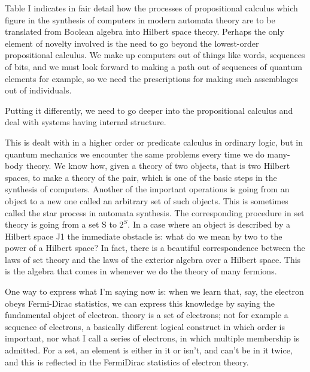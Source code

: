 Table I indicates in fair detail how the processes of propositional calculus which figure in the synthesis of computers in modern automata theory are to be translated from Boolean algebra into Hilbert space theory. Perhaps the only element of novelty involved is the need to go beyond the lowest-order propositional calculus. We make up computers out of things like words, sequences of bits, and we must look forward to making a path out of sequences of quantum elements for example, so we need the prescriptions for making such assemblages out of individuals.

Putting it differently, we need to go deeper into the propositional calculus and deal with systems having internal structure.

This is dealt with in a higher order or predicate calculus in ordinary logic, but in quantum mechanics we encounter the same problems every time we do many-body theory. We know how, given a theory of two objects, that is two Hilbert spaces, to make a theory of the pair, which is one of the basic steps in the synthesis of computers. Another of the important operations is going from an object to a new one called an arbitrary set of such objects. This is sometimes called the star process in automata synthesis.
The corresponding procedure in set theory is going from a set S to $2^S$. In a case where an object is described by a Hilbert space J1 the immediate obstacle is: what do we mean by two to the power of a Hilbert space? In fact, there is a beautiful correspondence between the laws of set theory and the laws of the exterior algebra over a Hilbert space. This is the algebra that comes in whenever we do the theory of many fermions.

One way to express what I'm saying now is: when we learn that, say, the electron obeys Fermi-Dirac statistics, we can express this knowledge by saying the fundamental object of electron. theory is a set of electrons; not for example a sequence of electrons, a basically different logical construct in which order is important, nor what I call a series of electrons, in which multiple membership is admitted. For a set, an element is either in it or isn't, and can't be in it twice, and this is reflected in the Fermi­Dirac statistics of electron theory.

